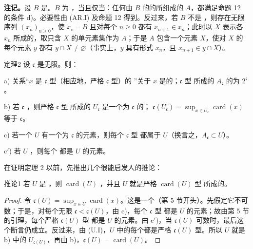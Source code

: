 \textbf{注记。}设 $B$ 是。$B$ 为 ，当且仅当：任何由 $B$ 的的所组成的 $A$，都满足命题 12 的条件 d)。必要性由 (AR.I) 及命题 12 得到。反过来，若 $B$ 不是 ，则存在无限序列 $(x_n)_{n\geq0}$，使 $x_\circ=B$ 且对每个 $n\geq0$ 都有 $x_{n+1}\in x_n$；此时以 $X$ 表示各 $x_n$ 所成的，取只含 $X$ 的单元素集作为 $A$；于是 $A$ 包含一个元素 $X$，使对 $X$ 的每个元素 $y$ 都有 $y\cap X\ne\varnothing$（事实上，$y$ 具有形式 $x_n$，且 $x_{n+1}\in y\cap X$）。

\begin{SGAresult}{定理}{2}
设 $\mathfrak{c}$ 是无限。则：

a) 关系“$x$ 是 $\mathfrak{c}$ 型（相应地，严格 $\mathfrak{c}$ 型）的 ”关于 $x$ 是的；$\mathfrak{c}$ 型 所成的 $A_{\mathfrak{c}}$ 的为 $2^{\mathfrak{c}}$。

b) 若 $\mathfrak{c}$ ，则严格 $\mathfrak{c}$ 型 所成的 $U_{\mathfrak{c}}$ 是一个为 $\mathfrak{c}$ 的； $\mathfrak{c}(U_{\mathfrak{c}})=\sup_{x\in U_{\mathfrak{c}}}\operatorname{card}(x)$ 等于 $\mathfrak{c}$。

c) 若一个 $U$ 有一个为 $\mathfrak{c}$ 的元素，则每个 $\mathfrak{c}$ 型 都属于 $U$（换言之，$A_{\mathfrak{c}}\subset U$）。

c$'$) 若 $U$ ，则每个 都是 $U$ 的元素。
\end{SGAresult}
在证明定理 2 以前，先推出几个很能启发人的推论：
\begin{SGAresult}{推论}{1}
若 $U$ 是 ，则 $\operatorname{card}(U)$ ，并且 $U$ 就是严格 $\operatorname{card}(U)$ 型 所成的。
\end{SGAresult}
\begin{proof}
令 $\mathfrak{c}(U)=\sup_{x\in U}\operatorname{card}(x)$。这是一个（第 5 节开头）。先假定它不可数；于是，对每个无限
$\mathfrak{c}<\mathfrak{c}(U)$，由 c)，每个 $\mathfrak{c}$ 型 都是 $U$ 的元素；故由第 5 节的引理，每个严格 $\mathfrak{c}(U)$ 型 都是 $U$ 的元素。由 c$'$)，当 $\mathfrak{c}(U)$ 可数时，最后这个断言仍成立。反过来，由 (U.I)，$U$ 中的每个都是严格 $\mathfrak{c}(U)$ 型。所以 $U$ 就是 b) 中的 $U_{\mathfrak{c}(U)}$，再由 b)，$\mathfrak{c}(U)=\operatorname{card}(U)$。
\end{proof}
